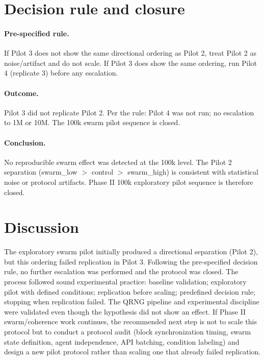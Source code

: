 \documentclass[reprint,amsmath,amssymb,aps,showkeys]{revtex4-2}
\begin{document}
\section{Decision rule and closure}

\paragraph{Pre-specified rule.}
If Pilot 3 does not show the same directional ordering as Pilot 2, treat Pilot 2 as noise/artifact and do not scale. If Pilot 3 does show the same ordering, run Pilot 4 (replicate 3) before any escalation.

\paragraph{Outcome.}
Pilot 3 did not replicate Pilot 2. Per the rule: Pilot 4 was not run; no escalation to 1M or 10M. The 100k swarm pilot sequence is closed.

\paragraph{Conclusion.}
No reproducible swarm effect was detected at the 100k level. The Pilot 2 separation (swarm\_low $>$ control $>$ swarm\_high) is consistent with statistical noise or protocol artifacts. Phase II 100k exploratory pilot sequence is therefore closed.

\section{Discussion}

The exploratory swarm pilot initially produced a directional separation (Pilot 2), but this ordering failed replication in Pilot 3. Following the pre-specified decision rule, no further escalation was performed and the protocol was closed. The process followed sound experimental practice: baseline validation; exploratory pilot with defined conditions; replication before scaling; predefined decision rule; stopping when replication failed. The QRNG pipeline and experimental discipline were validated even though the hypothesis did not show an effect. If Phase II swarm/coherence work continues, the recommended next step is not to scale this protocol but to conduct a protocol audit (block synchronization timing, swarm state definition, agent independence, API batching, condition labeling) and design a new pilot protocol rather than scaling one that already failed replication.
\end{document}
